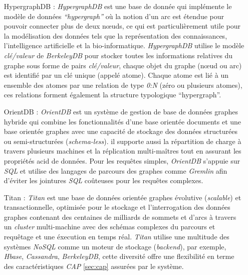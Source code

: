    \begin{itemize}
    \item [HypergraphDB]: \emph{HypergraphDB} \cite{hypergraphdb,
        iordanov2010hypergraphdb} est une base de donnée qui
      implémente le modèle de données \emph{``hypergraph''} où la
      notion d'un arc est étendue pour pouvoir connecter plus de deux
      nœuds, ce qui est particulièrement utile pour la modélisation
      des données tels que la représentation des connaissances,
      l'intelligence artificielle et la
      bio-informatique. \emph{HypergraphDB} utilise le modèle
      \textit{clé/valeur} de \emph{BerkeleyDB} \cite{berkeleydb} pour
      stocker toutes les informations relatives du graphe sous forme
      de pairs \textit{clé/valeur}, chaque objet du graphe (nœud ou
      arc) est identifié par un clé unique (appelé atome). Chaque
      atome est lié à un ensemble des atomes par une relation de type
      \emph{0:N} (zéro ou plusieurs atomes), ces relations forment
      également la structure typologique ``hypergraph''.

    \item [OrientDB]: \emph{OrientDB} \cite{orientdb} est un système
      de gestion de base de données graphes hybride qui combine les
      fonctionnalités d'une base orientée documents et une base
      orientée graphes avec une capacité de stockage des données
      structurées ou semi-structurées (\emph{schema-less}). il
      supporte aussi la répartition de charge à travers plusieurs
      machines et la réplication multi-maîtres tout en assurant les
      propriétés \acrshort{acid} de données. Pour les requêtes
      simples, \emph{OrientDB} s'appuie sur \emph{SQL} et utilise des
      langages de parcours des graphes comme \emph{Gremlin} afin
      d'éviter les jointures \emph{SQL} coûteuses pour les requêtes
      complexes.

      \newpage
    \item [Titan]: \emph{Titan} \cite{titan} est une base de données
      orientée graphes évolutive (\emph{scalable}) et
      transactionnelle, optimisée pour le stockage et l'interrogation
      des données graphes contenant des centaines de milliards de
      sommets et d'arcs à travers un \emph{cluster} multi-machine avec
      des schémas complexes du parcours et requêtage et une éxecution
      en temps réal. \emph{Titan} utilise une multitude des systèmes
      \emph{NoSQL} comme un moteur de stockage (\emph{backend}), par
      exemple, \emph{Hbase}, \emph{Cassandra}, \emph{BerkeleyDB},
      cette diversité offre une flexibilité en terme des
      caractéristiques \emph{CAP} \ref{sec:cap} assurées par le
      système.
    \end{itemize}

